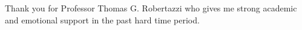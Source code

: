 Thank you for Professor Thomas G. Robertazzi who gives me strong academic and emotional support in the past hard time period.  